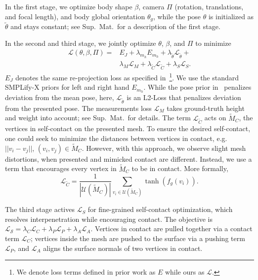 \documentclass[final]{cvpr}
\newcommand{\suppmat}{Sup.~Mat.\xspace}
\theoremstyle{definition}
\begin{document}
In the first stage, we optimize body shape $\beta$, camera $\Pi$ (rotation, translations, and focal length), and body global orientation $\theta_g$, while the pose $\theta$ is initialized as $\tilde{\theta}$ and stays constant; see \suppmat~for a description of the first stage.

In the second and third stage, we jointly optimize $\theta$, $\beta$, and $\Pi$  to minimize 
\begin{equation}
\begin{aligned}
\mathcal{L}(\theta, \beta, \Pi) = & E_J + \lambda_{m_h}E_{m_h} + \lambda_{\tilde{\theta}} \mathcal{L}_{\tilde{\theta}} + \\
& \lambda_{M} \mathcal{L}_M + \lambda_{\tilde{C}} \mathcal{L}_{\tilde{C}} + \lambda_{S} \mathcal{L}_{S}.
\end{aligned}
\end{equation}
$E_J$ denotes the same re-projection loss as specified in~\cite{SMPL-X:2019}\footnote{We denote loss terms defined in prior work as $E$ while ours as $\mathcal{L}$.}. We use the standard SMPLify-X  priors for left and right hand $E_{m_h}$. While the pose prior in~\cite{SMPL-X:2019} penalizes deviation from the mean pose, here, $\mathcal{L}_{\tilde{\theta}}$ is an L2-Loss that penalizes deviation from the presented pose. The measurements loss $\mathcal{L}_M$ takes ground-truth height and weight into account; see \suppmat~for details. The term $\mathcal{L}_{\tilde{C}}$ acts on $\tilde{M}_C$, 
the vertices in self-contact on the presented mesh.
To ensure the desired self-contact, one could seek to minimize the distances between vertices in contact, e.g.~$||v_i - v_j||$, $(v_i, v_j) \in \tilde{M}_C$. However, with this approach, we observe slight mesh distortions, when presented and mimicked contact are different.
Instead, we use a term that encourages every vertex in $\tilde{M}_C$ to be in contact. More formally, 
\begin{equation}
\mathcal{L}_{\tilde{C}} = \frac{1}{|\mathcal{U}(\tilde{M}_C)|} \sum_{v_i \in \mathcal{U}(\tilde{M}_C)} \tanh(f_{g}(v_i)).
\end{equation}

The third stage actives $\mathcal{L}_{S}$  for fine-grained self-contact optimization, which resolves interpenetration while encouraging contact. 
The objective is $\mathcal{L_S} = \lambda_{C} \mathcal{L}_{C} + \lambda_{P} \mathcal{L}_{P} +  \lambda_{A} \mathcal{L}_{A}$.
Vertices in contact are pulled together via a contact term $\mathcal{L}_{C}$; vertices inside the mesh are pushed to the surface via a pushing term $\mathcal{L}_{P}$, and $\mathcal{L}_{A}$ aligns the surface normals of two vertices in contact.
\end{document}
